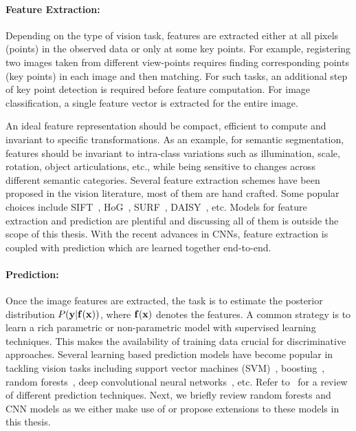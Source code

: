 \paragraph{Feature Extraction:}
Depending on the type of vision task, features are extracted either at all
pixels (points) in the observed data or only at some key points. For example,
registering two images taken from different view-points requires finding
corresponding points (key points) in each image and then matching.
For such tasks, an additional step of key point detection is required before
feature computation. For image classification, a single feature vector
is extracted for the entire image.

An ideal feature representation should be compact, efficient to compute
and invariant to specific transformations. As an example,
for semantic segmentation, features should be invariant to intra-class
variations such as illumination, scale, rotation, object articulations, etc.,
while being sensitive to changes across different semantic categories.
Several feature extraction schemes have
been proposed in the vision literature, most of them are hand crafted.
Some popular choices include SIFT~\cite{lowe1999object}, HoG~\cite{bay2006surf},
SURF~\cite{dalal2005histograms}, DAISY~\cite{tola2008fast}, etc.
Models for feature extraction and prediction are plentiful and discussing
all of them is outside the scope of this thesis.
With the recent advances in CNNs, feature extraction is coupled with
prediction which are learned together end-to-end.

\paragraph{Prediction:}
Once the image features are extracted, the task is to estimate the
posterior distribution $P(\mathbf{y}|\mathbf{f}(\mathbf{x}))$, where $\mathbf{f}(\mathbf{x})$ denotes the features.
A common strategy is to learn a rich parametric or non-parametric model with
supervised learning techniques. This makes the availability of training data
crucial for discriminative approaches. Several learning based prediction
models have become popular in tackling vision tasks including support vector
machines (SVM)~\cite{cortes1995support},
boosting~\cite{schapire1990strength, freund1995desicion},
random forests~\cite{breiman2001random,ho1995random},
deep convolutional neural networks~\cite{lecun1998gradient},
etc. Refer to~\cite{friedman2001elements}
for a review of different prediction techniques.
Next, we briefly review random forests and CNN models as we either make use of
or propose extensions to these models in this thesis.

